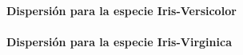 \documentclass[11pt,]{article}
\let\oldparagraph\paragraph
\renewcommand{\paragraph}[1]{\oldparagraph{#1}\mbox{}}
\begin{document}
\hypertarget{dispersiuxf3n-para-la-especie-iris-versicolor}{%
\paragraph{Dispersión para la especie
Iris-Versicolor}\label{dispersiuxf3n-para-la-especie-iris-versicolor}}

\hypertarget{dispersiuxf3n-para-la-especie-iris-virginica}{%
\paragraph{Dispersión para la especie
Iris-Virginica}\label{dispersiuxf3n-para-la-especie-iris-virginica}}
\end{document}
